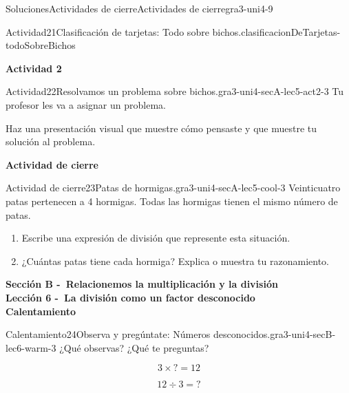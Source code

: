 \documentclass[twoside,10pt,]{article}
\begin{document}
\begin{solutions-section}{Soluciones}{Actividades de cierre}{}{Actividades de cierre}{}{}{gra3-uni4-9}
\begin{activitysolution}{Actividad}{21}{Clasificación de tarjetas: Todo sobre bichos.}{clasificacionDeTarjetas-todoSobreBichos}
\end{activitysolution}%
\par\medskip
\noindent\textbf{\large{}\space\textperiodcentered\space{}Actividad 2}
\begin{activitysolution}{Actividad}{22}{Resolvamos un problema sobre bichos.}{gra3-uni4-secA-lec5-act2-3}%
Tu profesor les va a asignar un problema.%
\par
Haz una presentación visual que muestre cómo pensaste y que muestre tu solución al problema.%
\end{activitysolution}%
\par\medskip
\noindent\textbf{\large{}\space\textperiodcentered\space{}Actividad de cierre}
\begin{projectsolution}{Actividad de cierre}{23}{Patas de hormigas.}{gra3-uni4-secA-lec5-cool-3}%
Veinticuatro patas pertenecen a 4 hormigas. Todas las hormigas tienen el mismo número de patas.%
\par
%
\begin{enumerate}
\item{}Escribe una expresión de división que represente esta situación.%
\item{}¿Cuántas patas tiene cada hormiga? Explica o muestra tu razonamiento.%
\end{enumerate}
%
\end{projectsolution}%
\par\medskip
\noindent\textbf{\large{}\space\textperiodcentered\space{}Sección B -~Relacionemos la multiplicación y la división\\
\space\textperiodcentered\space{}Lección 6 -~La división como un factor desconocido\\
\space\textperiodcentered\space{}Calentamiento}
\begin{explorationsolution}{Calentamiento}{24}{Observa y pregúntate: Números desconocidos.}{gra3-uni4-secB-lec6-warm-3}%
¿Qué observas? ¿Qué te preguntas?%
\begin{sidebyside}{2}{0}{0}{0}%
\begin{sbspanel}{0.5}%
%
\begin{equation*}
3\times {?} =12
\end{equation*}
%
\end{sbspanel}%
\begin{sbspanel}{0.5}%
\par
%
\begin{equation*}
12\div 3 ={?}
\end{equation*}
%
\end{sbspanel}%

\end{sidebyside}
\end{explorationsolution}
\end{solutions-section}
\end{document}
